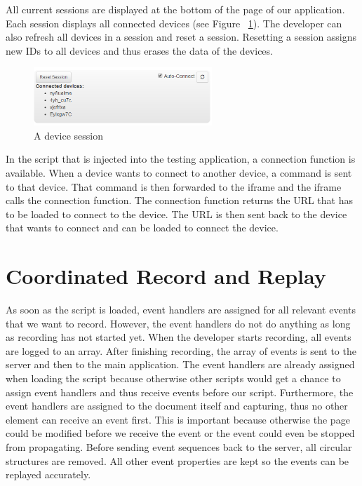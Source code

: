 All current sessions are displayed at the bottom of the page of our application. Each session displays all connected devices (see Figure ~\ref{fig:sessions}). The developer can also refresh all devices in a session and reset a session. Resetting a session assigns new IDs to all devices and thus erases the data of the devices. 

\begin{figure}[H]
  \centering
    \includegraphics[width=0.6\textwidth]{images/screenshots/session_management.png}
	\caption{A device session}
	\label{fig:sessions}
\end{figure}

In the script that is injected into the testing application, a connection function is available. When a device wants to connect to another device, a command is sent to that device. That command is then forwarded to the iframe and the iframe calls the connection function. The connection function returns the URL that has to be loaded to connect to the device. The URL is then sent back to the device that wants to connect and can be loaded to connect the device.

\section{Coordinated Record and Replay}

As soon as the script is loaded, event handlers are assigned for all relevant events that we want to record. However, the event handlers do not do anything as long as recording has not started yet. When the developer starts recording, all events are logged to an array. After finishing recording, the array of events is sent to the server and then to the main application. The event handlers are already assigned when loading the script because otherwise other scripts would get a chance to assign event handlers and thus receive events before our script. Furthermore, the event handlers are assigned to the document itself and capturing, thus no other element can receive an event first. This is important because otherwise the page could be modified before we receive the event or the event could even be stopped from propagating. Before sending event sequences back to the server, all circular structures are removed. All other event properties are kept so the events can be replayed accurately.

